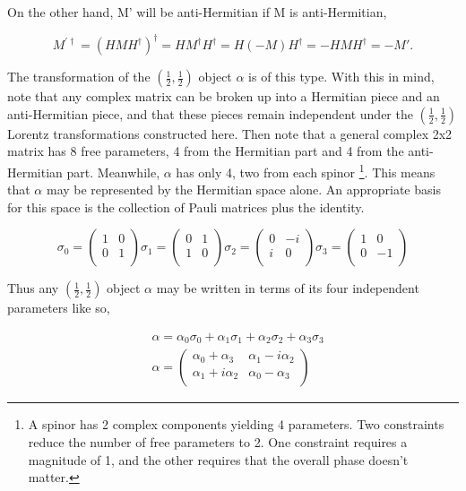 On the other hand, M' will be anti-Hermitian if M is anti-Hermitian,

\begin{equation}
M^{'\dagger} = (HMH^\dagger)^\dagger = HM^\dagger H^\dagger = H(-M)H^\dagger = -HMH^\dagger = -M'.
\end{equation}

The transformation of the $(\frac{1}{2}, \frac{1}{2})$ object $\alpha$ is of this type. With this in mind, note that any complex matrix can be broken up into a Hermitian piece and an anti-Hermitian piece, and that these pieces remain independent under the $(\frac{1}{2}, \frac{1}{2})$ Lorentz transformations constructed here. Then note that a general complex 2x2 matrix has 8 free parameters, 4 from the Hermitian part and 4 from the anti-Hermitian part. Meanwhile, $\alpha$ has only 4, two from each spinor \footnote{A spinor has 2 complex components yielding 4 parameters. Two constraints reduce the number of free parameters to 2. One constraint requires a magnitude of 1, and the other requires that the overall phase doesn't matter.}. This means that $\alpha$ may be represented by the Hermitian space alone. An appropriate basis for this space is the collection of Pauli matrices plus the identity.

\begin{equation}
\sigma_0 =  
\begin{pmatrix}
1 & 0 \\
0 & 1 \\
\end{pmatrix}
\sigma_1 =  
\begin{pmatrix}
0 & 1 \\
1 & 0 \\
\end{pmatrix}
\sigma_2 = 
\begin{pmatrix}
0 & -i \\
i & 0 \\
\end{pmatrix}
\sigma_3 = 
\begin{pmatrix}
1 & 0 \\
0 & -1 \\
\end{pmatrix}
\end{equation}

Thus any $(\frac{1}{2}, \frac{1}{2})$ object $\alpha$ may be written in terms of its four independent parameters like so, 

\begin{equation}
\begin{split}
&\alpha = \alpha_0 \sigma_0 + \alpha_1 \sigma_1 + \alpha_2 \sigma_2 + \alpha_3 \sigma_3 \\
&\alpha = 
\begin{pmatrix}
\alpha_0 + \alpha_3 & \alpha_1 - i\alpha_2 \\
\alpha_1 + i\alpha_2 & \alpha_0 - \alpha_3 \\
\end{pmatrix}
\end{split}
\end{equation}

